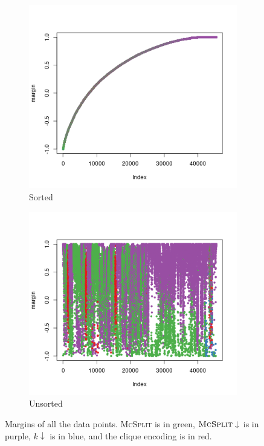 \documentclass{l4proj}
\theoremstyle{definition}
\theoremstyle{remark}
\begin{document}
\begin{figure}
  \centering
  \begin{subfigure}[t]{0.49\textwidth}
    \centering
    \includegraphics[scale=0.5]{images/unlabelled_margin.png}
    \caption{Sorted}
  \end{subfigure}
  \begin{subfigure}[t]{0.49\textwidth}
    \centering
    \includegraphics[scale=0.5]{images/unlabelled_margin2.png}
    \caption{Unsorted}
  \end{subfigure}
  \caption{Margins of all the data points. \textsc{McSplit} is in green,
    $\textsc{McSplit}\downarrow$ is in purple, $k\downarrow$ is in blue, and the
    clique encoding is in red.}
  \label{fig:unlabelled_margins}
\end{figure}
\end{document}
